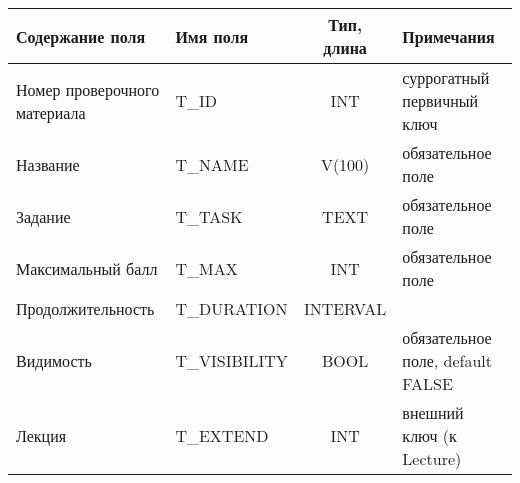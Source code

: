 \documentclass[a4paper,14pt]{article}
\begin{document}

\begin{table}[H]
	\begin{flushleft} 
	\end{flushleft}
	\begin{adjustbox}{width=\linewidth}
\begin{tabular}{|l|l|c|l|}
	\hline
	Содержание поля              & Имя поля      & Тип, длина & Примечания                       \\ \hline
	Номер проверочного материала & T\_ID         &    INT    & суррогатный первичный ключ       \\ \hline
	Название                     & T\_NAME       &   V(100)   & обязательное поле                \\ \hline
	Задание                      & T\_TASK       &    TEXT    & обязательное поле                \\ \hline
	Максимальный балл            & T\_MAX        &    INT    & обязательное поле                \\ \hline
	Продолжительность            & T\_DURATION   &  INTERVAL  &                                  \\ \hline
	Видимость                    & T\_VISIBILITY &    BOOL    & обязательное поле, default FALSE \\ \hline
	Лекция                       & T\_EXTEND     &    INT    & внешний ключ  (к Lecture)        \\ \hline
\end{tabular}
	\end{adjustbox}
\end{table}

\end{document}
